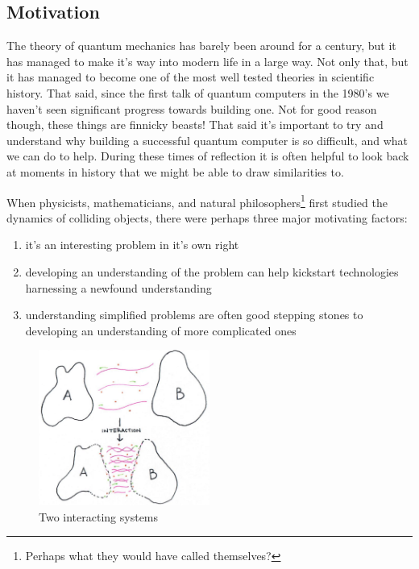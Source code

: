 \documentclass[11pt]{article}
\theoremstyle{definition}
\begin{document}
\subsection{Motivation}

The theory of quantum mechanics has barely been around for a century, but it has managed to make it's way into modern life in a large way. Not only that, but it has managed to become one of the most well tested theories in scientific history. That said, since the first talk of quantum computers in the 1980's we haven't seen significant progress towards building one. Not for good reason though, these things are finnicky beasts! That said it's important to try and understand why building a successful quantum computer is so difficult, and what we can do to help. During these times of reflection it is often helpful to look back at moments in history that we might be able to draw similarities to.

When physicists, mathematicians, and natural philosophers\footnote{Perhaps what they would have called themselves?} first studied the dynamics of colliding objects, there were perhaps three major motivating factors:
\begin{enumerate}
	\item it's an interesting problem in it's own right
	\item developing an understanding of the problem can help kickstart technologies harnessing a newfound understanding
	\item understanding simplified problems are often good stepping stones to developing an understanding of more complicated ones
\end{enumerate}

\begin{figure}[h!]
	\begin{center}
		\includegraphics[width=0.5\textwidth]{interaction.jpeg}
		\caption{Two interacting systems}\label{fig:interacting-systems}
	\end{center}
\end{figure}
\end{document}
